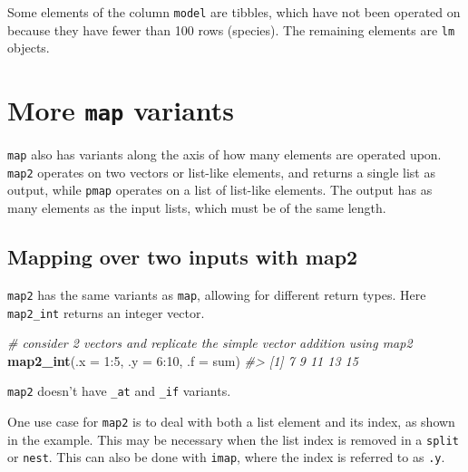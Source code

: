\documentclass[]{book}
\newenvironment{Shaded}{}{}
\newcommand{\CommentTok}[1]{\textcolor[rgb]{0.38,0.63,0.69}{\textit{#1}}}
\newcommand{\DataTypeTok}[1]{\textcolor[rgb]{0.56,0.13,0.00}{#1}}
\newcommand{\DecValTok}[1]{\textcolor[rgb]{0.25,0.63,0.44}{#1}}
\newcommand{\KeywordTok}[1]{\textcolor[rgb]{0.00,0.44,0.13}{\textbf{#1}}}
\newcommand{\NormalTok}[1]{#1}
\newcommand{\OperatorTok}[1]{\textcolor[rgb]{0.40,0.40,0.40}{#1}}
\begin{document}
Some elements of the column \texttt{model} are tibbles, which have not been operated on because they have fewer than 100 rows (species). The remaining elements are \texttt{lm} objects.

\hypertarget{more-map-variants}{%
\section{\texorpdfstring{More \texttt{map} variants}{More map variants}}\label{more-map-variants}}

\texttt{map} also has variants along the axis of how many elements are operated upon. \texttt{map2} operates on two vectors or list-like elements, and returns a single list as output, while \texttt{pmap} operates on a list of list-like elements.
The output has as many elements as the input lists, which must be of the same length.

\hypertarget{mapping-over-two-inputs-with-map2}{%
\subsection{Mapping over two inputs with map2}\label{mapping-over-two-inputs-with-map2}}

\texttt{map2} has the same variants as \texttt{map}, allowing for different return types.
Here \texttt{map2\_int} returns an integer vector.

\begin{Shaded}
\begin{Highlighting}[]
\CommentTok{# consider 2 vectors and replicate the simple vector addition using map2}
\KeywordTok{map2_int}\NormalTok{(}\DataTypeTok{.x =} \DecValTok{1}\OperatorTok{:}\DecValTok{5}\NormalTok{, }
         \DataTypeTok{.y =} \DecValTok{6}\OperatorTok{:}\DecValTok{10}\NormalTok{,}
         \DataTypeTok{.f =}\NormalTok{ sum)}
\CommentTok{#> [1]  7  9 11 13 15}
\end{Highlighting}
\end{Shaded}

\texttt{map2} doesn't have \texttt{\_at} and \texttt{\_if} variants.

One use case for \texttt{map2} is to deal with both a list element and its index, as shown in the example. This may be necessary when the list index is removed in a \texttt{split} or \texttt{nest}. This can also be done with \texttt{imap}, where the index is referred to as \texttt{.y}.
\end{document}
